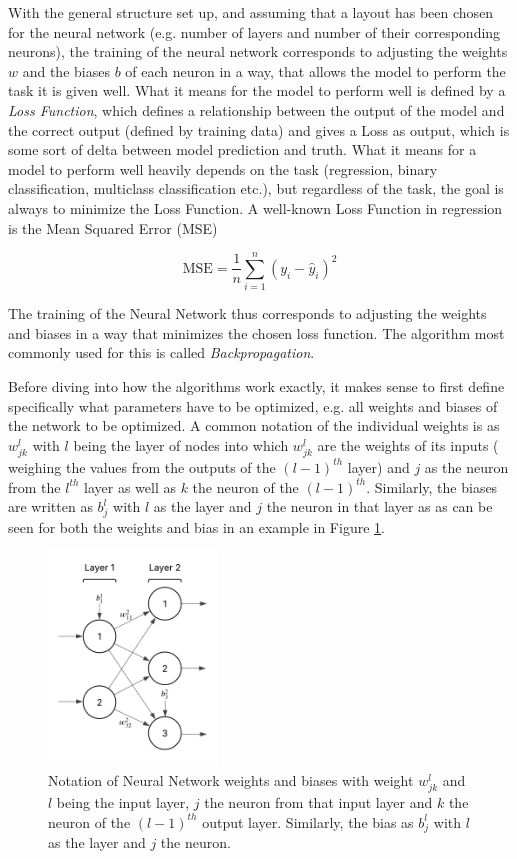 With the general structure set up, and assuming that a layout has been chosen for the neural network (e.g. number of layers and number of their corresponding neurons), the training of the neural network corresponds to adjusting the weights $w$ and the biases $b$ of each neuron in a way, that allows the model to perform the task it is given well. What it means for the model to perform well is defined by a \textit{Loss Function}, which defines a relationship between the output of the model and the correct output (defined by training data) and gives a Loss as output, which is some sort of delta between model prediction and truth. What it means for a model to perform well heavily depends on the task (regression, binary classification, multiclass classification etc.), but regardless of the task, the goal is always to minimize the Loss Function. A well-known Loss Function in regression is the Mean Squared Error (MSE)

\[
\text{MSE} = \frac{1}{n} \sum_{i=1}^{n} (y_i - \hat{y}_i)^2
\]

The training of the Neural Network thus corresponds to adjusting the weights and biases in a way that minimizes the chosen loss function. The algorithm most commonly used for this is called \textit{Backpropagation}.
 \cite{nielsen2015neuralChap1}
 
 Before diving into how the algorithms work exactly, it makes sense to first define specifically what parameters have to be optimized, e.g. all weights and biases of the network to be optimized. A common notation of the individual weights is as $w_{jk}^l$ with $l$ being the layer of nodes into which $w_{jk}^l$ are the weights of its inputs ( weighing the values from the outputs of the $(l-1)^{th}$ layer) and $j$ as the neuron from the $l^{th}$ layer as well as $k$ the neuron of the  $(l-1)^{th}$. Similarly, the biases are written as $b_j^l$ with $l$ as the layer and $j$ the neuron in that layer as as can be seen for both the weights and bias in an example in Figure \ref{fig:bias_and_weights_notation}.
 
 
 \begin{figure}[h] 
 	\centering
 	\includegraphics[width=0.4\textwidth]{figures/modelling/bias_and_weights_notation.png} 
 	\caption{Notation of Neural Network weights and biases with weight $w_{jk}^l$ and $l$ being the input layer,  $j$ the neuron from that input layer and $k$ the neuron of the  $(l-1)^{th}$ output layer. Similarly, the bias as $b_j^l$ with $l$ as the layer and $j$ the neuron.}
 	\label{fig:bias_and_weights_notation}
 \end{figure}
 
